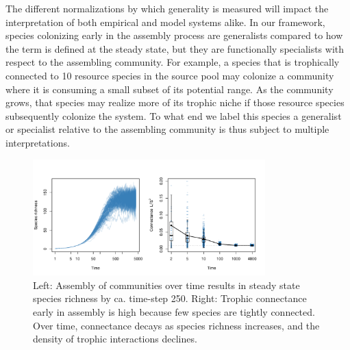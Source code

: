 \documentclass[twocolumn,preprintnumbers,amsmath,amssymb,superscriptaddress,linenumbers]{revtex4-1}
\begin{document}
The different normalizations by which generality is measured will impact the interpretation of both empirical and model systems alike.
In our framework, species colonizing early in the assembly process are generalists compared to how the term is defined at the steady state, but they are functionally specialists with respect to the assembling community.
For example, a species that is trophically connected to 10 resource species in the source pool may colonize a community where it is consuming a small subset of its potential range.
As the community grows, that species may realize more of its trophic niche if those resource species subsequently colonize the system.
To what end we label this species a generalist or specialist relative to the assembling community is thus subject to multiple interpretations.



\begin{figure}[h!]
\centering
\includegraphics[width=0.8\textwidth]{fig_conn.pdf}
\caption{
Left: Assembly of communities over time results in steady state species richness by ca. time-step 250.
Right: Trophic connectance early in assembly is high because few species are tightly connected.
Over time, connectance decays as species richness increases, and the density of trophic interactions declines.
}
\label{fig:conn}
\end{figure}
\end{document}
